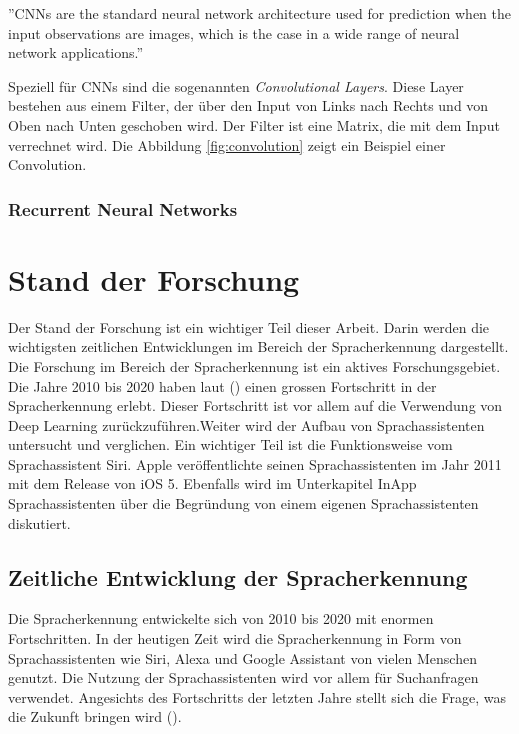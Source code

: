 \documentclass[11pt,a4paper]{article}
\begin{document}
\begin{displayquote}
	''CNNs are the standard neural network architecture used for prediction when the input
	observations are images, which is the case in a wide range of neural network applications.''
\end{displayquote}

\noindent
Speziell für CNNs sind die sogenannten \textit{Convolutional Layers}. Diese Layer bestehen aus
einem Filter, der über den Input von Links nach Rechts und von Oben nach Unten geschoben wird.
Der Filter ist eine Matrix, die mit dem Input verrechnet wird. Die Abbildung \ref{fig:convolution}
zeigt ein Beispiel einer Convolution.




\subsubsection{Recurrent Neural Networks}


\newpage \section{Stand der Forschung}
Der Stand der Forschung ist ein wichtiger Teil dieser Arbeit. Darin werden die wichtigsten
zeitlichen Entwicklungen im Bereich der Spracherkennung dargestellt. Die Forschung im Bereich 
der Spracherkennung ist ein aktives Forschungsgebiet. Die Jahre 2010 bis 2020 haben laut 
(\cite{hannun2021history}) einen grossen Fortschritt in der Spracherkennung erlebt. Dieser 
Fortschritt ist vor allem auf die Verwendung von Deep Learning zurückzuführen.Weiter wird der 
Aufbau von Sprachassistenten untersucht und verglichen. Ein wichtiger Teil ist die Funktionsweise 
vom Sprachassistent Siri. Apple veröffentlichte seinen Sprachassistenten im Jahr 2011 mit dem 
Release von iOS 5. Ebenfalls wird im Unterkapitel InApp Sprachassistenten über die Begründung 
von einem eigenen Sprachassistenten diskutiert.


\subsection{Zeitliche Entwicklung der Spracherkennung}
Die Spracherkennung entwickelte sich von 2010 bis 2020 mit enormen Fortschritten. In der heutigen
Zeit wird die Spracherkennung in Form von Sprachassistenten wie Siri, Alexa und Google Assistant von
vielen Menschen genutzt. Die Nutzung der Sprachassistenten wird vor allem für Suchanfragen
verwendet. Angesichts des Fortschritts der letzten Jahre stellt sich die Frage, was die Zukunft
bringen wird (\cite{hannun2021history}).
\end{document}
